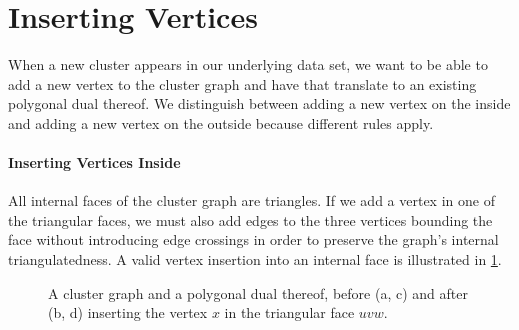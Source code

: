 \section{Inserting Vertices}
\label{sect:inserting-vertices}

When a new cluster appears in our underlying data set, we want to be able to add a new vertex to the cluster graph and have that translate to an existing polygonal dual thereof.
We distinguish between adding a new vertex on the inside and adding a new vertex on the outside because different rules apply.



\paragraph{Inserting Vertices Inside}

All internal faces of the cluster graph are triangles.
If we add a vertex in one of the triangular faces, we must also add edges to the three vertices bounding the face without introducing edge crossings in order to preserve the graph's internal triangulatedness.
A valid vertex insertion into an internal face is illustrated in \cref{fig:insert-vertex-example-inside}.

\begin{figure}[H]
	\centering
	\quad
	\qquad
	\quad
	\caption{A cluster graph and a polygonal dual thereof, before (a, c) and after (b, d) inserting the vertex $x$ in the triangular face $uvw$.}
	\label{fig:insert-vertex-example-inside}
\end{figure}

